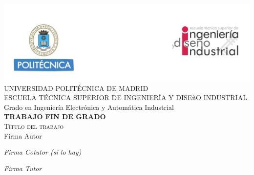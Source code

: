 \begin{titlepage}
\begin{center}

 \includegraphics[width=1\textwidth]{figuras/cabecera.png}  \\[0.5 cm]

\LARGE UNIVERSIDAD POLITÉCNICA DE MADRID \\ [1 cm]

\LARGE ESCUELA TÉCNICA SUPERIOR DE INGENIERÍA Y DISEñO INDUSTRIAL \\ [1 cm]

\LARGE Grado en Ingeniería Electrónica y Automática Industrial\\ [1 cm]

\LARGE \textbf{TRABAJO FIN DE GRADO}\\[1 cm]

\Huge \textsc{Título del trabajo}\\[4 cm]

\Large Firma Autor \\[3 cm]


\begin{multicols}{2} 
\begin{flushleft} 
\Large \emph{Firma Cotutor (si lo hay)}
\end{flushleft}

\begin{flushright} 
\Large \emph{Firma Tutor}
\end{flushright}

\end{multicols} 

\vfill

\end{center}
\end{titlepage}